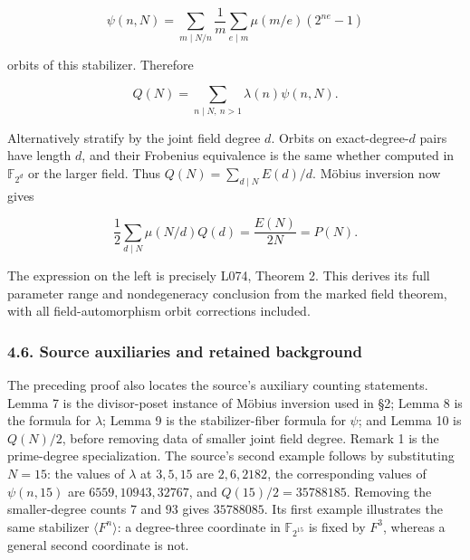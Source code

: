 \documentclass[
  11pt,
  a4paper,
]{article}
\begin{document}
\[\psi(n,N)=\sum_{m\mid N/n}\frac1m
       \sum_{e\mid m}\mu(m/e)(2^{ne}-1)\]

orbits of this stabilizer. Therefore

\[Q(N)=\sum_{n\mid N,\ n>1}\lambda(n)\psi(n,N).\]

Alternatively stratify by the joint field degree \(d\). Orbits on
exact-degree-\(d\) pairs have length \(d\), and their Frobenius
equivalence is the same whether computed in \(\mathbb F_{2^d}\) or the
larger field. Thus \(Q(N)=\sum_{d\mid N}E(d)/d\). Möbius inversion now
gives

\[\frac12\sum_{d\mid N}\mu(N/d)Q(d)=\frac{E(N)}{2N}=P(N).\]

The expression on the left is precisely L074, Theorem 2. This derives
its full parameter range and nondegeneracy conclusion from the marked
field theorem, with all field-automorphism orbit corrections included.

\subsubsection{4.6. Source auxiliaries and retained
background}\label{source-auxiliaries-and-retained-background}

The preceding proof also locates the source's auxiliary counting
statements. Lemma 7 is the divisor-poset instance of Möbius inversion
used in §2; Lemma 8 is the formula for \(\lambda\); Lemma 9 is the
stabilizer-fiber formula for \(\psi\); and Lemma 10 is \(Q(N)/2\),
before removing data of smaller joint field degree. Remark 1 is the
prime-degree specialization. The source's second example follows by
substituting \(N=15\): the values of \(\lambda\) at \(3,5,15\) are
\(2,6,2182\), the corresponding values of \(\psi(n,15)\) are
\(6559,10943,32767\), and \(Q(15)/2=35788185\). Removing the
smaller-degree counts \(7\) and \(93\) gives \(35788085\). Its first
example illustrates the same stabilizer \(\langle F^n\rangle\): a
degree-three coordinate in \(\mathbb F_{2^{15}}\) is fixed by \(F^3\),
whereas a general second coordinate is not.
\end{document}
